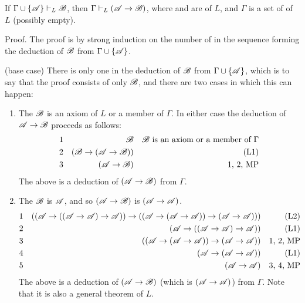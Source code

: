 \setcounter{definition}{7}
\begin{proposition}
  If \(\Gamma \cup \{\mathscr{A}\} \vdash_{L} \mathscr{B}\), then \(\Gamma \vdash_{L} (\mathscr{A} \rightarrow \mathscr{B})\), where \Cua{} and \Cub{} are \wfs{} of \(L\), and \(\Gamma\) is a set of \wfs{} of \(L\) (possibly empty).

  \noindent Proof. The proof is by strong induction on the number of \wfs{} in the sequence forming the deduction of \(\mathscr{B}\) from \(\Gamma \cup \{\mathscr{A}\}\).

  (base case) There is only one \wf{} in the deduction of \(\mathscr{B}\) from \(\Gamma \cup \{\mathscr{A}\}\), which is to say that the proof consists of only \(\mathscr{B}\), and there are two cases in which this can happen:
  \begin{enumerate}
    \item The \wf{} \(\mathscr{B}\) is an axiom of \(L\) or a member of \(\Gamma\). In either case the deduction of \(\mathscr{A} \rightarrow \mathscr{B}\) proceeds as follows:
      \begin{align*}
        \text{1}&&
        \mathscr{B}&&
        \text{\(\ensuremath\mathscr{B}\) is an axiom or a member of \(\Gamma\)}\\
        \text{2}&&
        (\mathscr{B} \rightarrow (\mathscr{A} \rightarrow \mathscr{B}))&&
        \text{(L1)}\\
        \text{3}&&
        (\mathscr{A} \rightarrow \mathscr{B})&&
        \text{1, 2, MP}
      \end{align*}
      The above is a deduction of \((\mathscr{A} \rightarrow \mathscr{B})\) from \(\Gamma\).

    \item The \wf{} \(\mathscr{B}\) is \(\mathscr{A}\), and so \((\mathscr{A} \rightarrow \mathscr{B})\) is \((\mathscr{A} \rightarrow \mathscr{A})\). 
      \begin{align*}
        \text{1}&&
        ((\mathscr{A} \rightarrow ((\mathscr{A} \rightarrow \mathscr{A}) \rightarrow \mathscr{A})) \rightarrow ((\mathscr{A} \rightarrow (\mathscr{A} \rightarrow \mathscr{A})) \rightarrow (\mathscr{A} \rightarrow \mathscr{A})))&&
        \text{(L2)}\\
        \text{2}&&
        (\mathscr{A} \rightarrow ((\mathscr{A} \rightarrow \mathscr{A}) \rightarrow \mathscr{A}))&&
        \text{(L1)}\\
        \text{3}&&
        ((\mathscr{A} \rightarrow (\mathscr{A} \rightarrow \mathscr{A})) \rightarrow (\mathscr{A} \rightarrow \mathscr{A}))&&
        \text{1, 2, MP}\\
        \text{4}&&
        (\mathscr{A} \rightarrow (\mathscr{A} \rightarrow \mathscr{A}))&&
        \text{(L1)}\\
        \text{5}&&
        (\mathscr{A} \rightarrow \mathscr{A})&&
        \text{3, 4, MP}
      \end{align*}
      The above is a deduction of \((\mathscr{A} \rightarrow \mathscr{B})\) (which is \((\mathscr{A} \rightarrow \mathscr{A})\)) from \(\Gamma\). Note that it is also a general theorem of \(L\).
  \end{enumerate}


\end{proposition}
